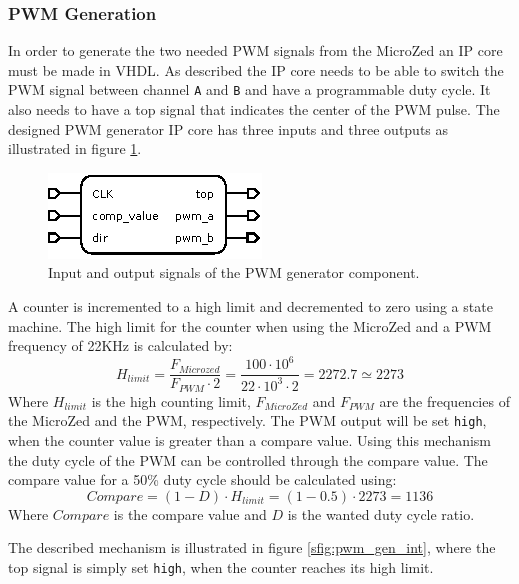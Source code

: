 \subsubsection{PWM Generation} %
\label{ssub:pwm_generation}
In order to generate the two needed PWM signals from the MicroZed an IP core must be made in VHDL.
As described the IP core needs to be able to switch the PWM signal between channel \texttt{A} and \texttt{B} and have a programmable duty cycle.
It also needs to have a top signal that indicates the center of the PWM pulse.
The designed PWM generator IP core has three inputs and three outputs as illustrated in figure \ref{fig:pwm_gen_component}.
\begin{figure}[h]
	\centering
	\includegraphics[width=.4\linewidth]{graphics/pwm_generator}
	\caption{Input and output signals of the PWM generator component.}
	\label{fig:pwm_gen_component}
\end{figure}
A counter is incremented to a high limit and decremented to zero using a state machine.
The high limit for the counter when using the MicroZed and a PWM frequency of 22KHz is calculated by:
\begin{equation}
	H_{limit} = \frac{F_{Microzed}}{F_{PWM}\cdot 2} = \frac{100\cdot 10^6}{22\cdot 10^3 \cdot 2} = 2272.7 \simeq 2273
\end{equation}
Where $H_{limit}$ is the high counting limit, $F_{MicroZed}$ and $F_{PWM}$ are the frequencies of the MicroZed and the PWM, respectively. 
The PWM output will be set \texttt{high}, when the counter value is greater than a compare value.
Using this mechanism the duty cycle of the PWM can be controlled through the compare value.
The compare value for a 50\% duty cycle should be calculated using:
\begin{equation}
	Compare = (1 - D) \cdot H_{limit} = (1 - 0.5) \cdot 2273 = 1136
\end{equation}
Where $Compare$ is the compare value and $D$ is the wanted duty cycle ratio.

The described mechanism is illustrated in figure \ref{sfig:pwm_gen_int}, where the top signal is simply set \texttt{high}, when the counter reaches its high limit.


